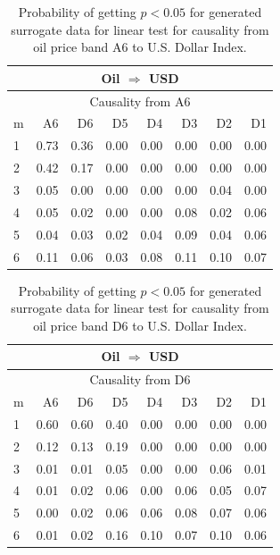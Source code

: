 %
%
\begin{table}[H]
\begin{center}
\begin{tabular}{l|r r r r r r r}
\hline\hline
\multicolumn{8}{c}{Oil $\Rightarrow$ USD}\\
\hline
\multicolumn{8}{c}{Causality from A6}\\
\hline\hline
m & A6 & D6 & D5 & D4 & D3 & D2 & D1 \\
\hline
1 & 0.73 & 0.36 & 0.00 & 0.00 & 0.00 & 0.00 & 0.00 \\
2 & 0.42 & 0.17 & 0.00 & 0.00 & 0.00 & 0.00 & 0.00 \\
3 & 0.05 & 0.00 & 0.00 & 0.00 & 0.00 & 0.04 & 0.00 \\
4 & 0.05 & 0.02 & 0.00 & 0.00 & \cellcolor{mygreen}0.08 & 0.02 & \cellcolor{mygreen}0.06 \\
5 & 0.04 & 0.03 & 0.02 & 0.04 & \cellcolor{mygreen}0.09 & 0.04 & 0.06 \\
6 & 0.11 & 0.06 & 0.03 & 0.08 & 0.11 & 0.10 & 0.07 \\
\hline\hline
\end{tabular}
\caption{Probability of getting $p < 0.05$ for generated surrogate data for linear test for causality from oil price band A6 to U.S. Dollar Index.}
\end{center}
\end{table}

%
%
\begin{table}[H]
\begin{center}
\begin{tabular}{l|r r r r r r r}
\hline\hline
\multicolumn{8}{c}{Oil $\Rightarrow$ USD}\\
\hline
\multicolumn{8}{c}{Causality from D6}\\
\hline\hline
m & A6 & D6 & D5 & D4 & D3 & D2 & D1 \\
\hline
1 & \cellcolor{mygrey}0.60 & \cellcolor{mygrey}0.60 & \cellcolor{mygrey}0.40 & 0.00 & 0.00 & 0.00 & 0.00 \\
2 & 0.12 & 0.13 & \cellcolor{mygrey}0.19 & 0.00 & 0.00 & 0.00 & 0.00 \\
3 & 0.01 & 0.01 & 0.05 & 0.00 & 0.00 & 0.06 & 0.01 \\
4 & 0.01 & 0.02 & 0.06 & 0.00 & 0.06 & 0.05 & 0.07 \\
5 & 0.00 & 0.02 & 0.06 & 0.06 & 0.08 & 0.07 & 0.06 \\
6 & 0.01 & 0.02 & 0.16 & 0.10 & 0.07 & 0.10 & 0.06 \\
\hline\hline
\end{tabular}
\caption{Probability of getting $p < 0.05$ for generated surrogate data for linear test for causality from oil price band D6 to U.S. Dollar Index.}
\end{center}
\end{table}

